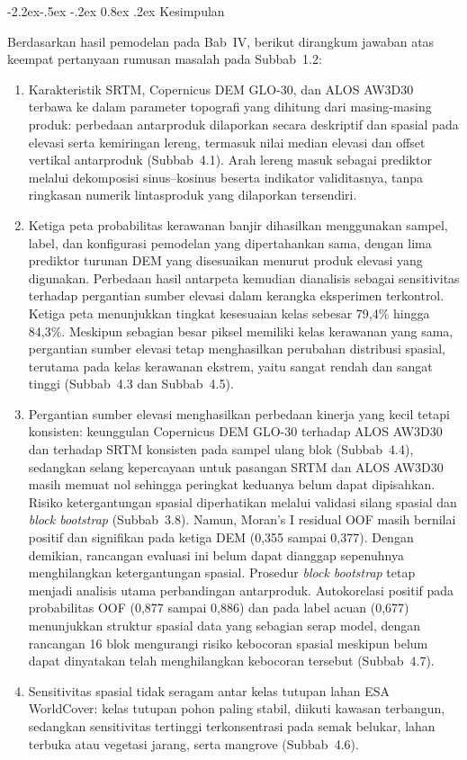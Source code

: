 \documentclass[12pt,a4paper]{article}
\makeatletter
\renewcommand\subsection{\@startsection{subsection}{2}{\z@}%
  {-2.2ex\@plus -.5ex \@minus -.2ex}%
  {0.8ex \@plus .2ex}%
  {\normalfont\normalsize\bfseries}}
\makeatother
\begin{document}
\subsection{Kesimpulan}

Berdasarkan hasil pemodelan pada Bab~IV, berikut dirangkum jawaban atas
keempat pertanyaan rumusan masalah pada Subbab~1.2:

\begin{enumerate}
\item Karakteristik SRTM, Copernicus DEM GLO-30, dan ALOS AW3D30 terbawa
ke dalam parameter topografi yang dihitung dari masing-masing produk:
perbedaan antarproduk dilaporkan secara deskriptif dan spasial pada elevasi
serta kemiringan lereng, termasuk nilai median elevasi dan offset vertikal
antarproduk (Subbab~4.1). Arah lereng masuk sebagai prediktor melalui
dekomposisi sinus--kosinus beserta indikator validitasnya, tanpa ringkasan
numerik lintasproduk yang dilaporkan tersendiri.
\item Ketiga peta probabilitas kerawanan banjir dihasilkan menggunakan sampel,
label, dan konfigurasi pemodelan yang dipertahankan sama, dengan lima
prediktor turunan DEM yang disesuaikan menurut produk elevasi yang digunakan.
Perbedaan hasil antarpeta kemudian dianalisis sebagai sensitivitas terhadap
pergantian sumber elevasi dalam kerangka eksperimen terkontrol. Ketiga peta
menunjukkan tingkat kesesuaian kelas sebesar 79,4\% hingga 84,3\%.
Meskipun sebagian besar piksel memiliki kelas kerawanan yang sama,
pergantian sumber elevasi tetap menghasilkan perubahan distribusi spasial,
terutama pada kelas kerawanan ekstrem, yaitu sangat rendah dan sangat tinggi
(Subbab~4.3 dan Subbab~4.5).
\item Pergantian sumber elevasi menghasilkan perbedaan kinerja yang kecil
tetapi konsisten: keunggulan Copernicus DEM GLO-30 terhadap ALOS AW3D30 dan
terhadap SRTM konsisten pada sampel ulang blok (Subbab~4.4), sedangkan
selang kepercayaan untuk pasangan SRTM dan ALOS AW3D30 masih memuat nol
sehingga peringkat keduanya belum dapat dipisahkan. Risiko ketergantungan
spasial diperhatikan melalui validasi silang spasial dan \textit{block bootstrap}
(Subbab~3.8). Namun, Moran's I residual OOF masih bernilai positif dan
signifikan pada ketiga DEM (0,355 sampai 0,377). Dengan demikian, rancangan
evaluasi ini belum dapat dianggap sepenuhnya menghilangkan ketergantungan
spasial. Prosedur \textit{block bootstrap} tetap menjadi analisis utama perbandingan
antarproduk.
Autokorelasi positif pada probabilitas OOF (0,877 sampai 0,886) dan pada label
acuan (0,677) menunjukkan struktur spasial data yang sebagian serap model,
dengan rancangan 16 blok mengurangi risiko kebocoran spasial meskipun belum
dapat dinyatakan telah menghilangkan kebocoran tersebut (Subbab~4.7).
\item Sensitivitas spasial tidak seragam antar kelas tutupan lahan ESA
WorldCover: kelas tutupan pohon paling stabil, diikuti kawasan terbangun,
sedangkan sensitivitas tertinggi terkonsentrasi pada semak belukar, lahan
terbuka atau vegetasi jarang, serta mangrove (Subbab~4.6).
\end{enumerate}
\end{document}
